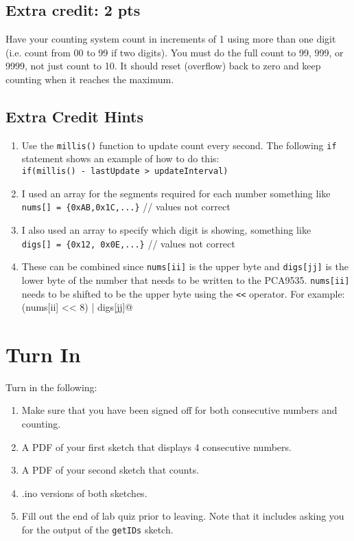 \subsection{Extra credit: 2 pts}
Have your counting system count in increments of 1 using more than one digit (i.e. 
count from 00 to 99 if two digits). You must do the full count to 99, 999, or 9999,
not just count to 10. It should reset (overflow) back to zero and keep counting 
when it reaches the maximum. 
\subsection{Extra Credit Hints}
\begin{enumerate}
    \item Use the \lstinline|millis()| function to update count every second. The 
            following \lstinline|if| statement shows an example of how to do this: \\
            \lstinline|if(millis() - lastUpdate > updateInterval)|
    \item I used an array for the segments required for each number something like \\
            \lstinline|nums[] = {0xAB,0x1C,...}|  // values not correct
    \item I also used an array to specify which digit is showing, something like \\
            \lstinline|digs[] = {0x12, 0x0E,...}| // values not correct
    \item These can be combined since \lstinline|nums[ii]| is the upper byte and 
            \lstinline|digs[jj]| is the lower byte of the number that needs to be 
            written to the PCA9535. \lstinline|nums[ii]| needs to be shifted to be 
            the upper byte using the \lstinline|<<| operator. For example: \\
            \lstinline@(nums[ii] << 8) | digs[jj]@ 
\end{enumerate}

\section{Turn In}
Turn in the following:
\begin{enumerate}
    \item Make sure that you have been signed off for both consecutive numbers and counting.
    \item A PDF of your first sketch that displays 4 consecutive numbers.
    \item A PDF of your second sketch that counts.
    \item .ino versions of both sketches.
    \item Fill out the end of lab quiz prior to leaving. Note that it includes asking you 
            for the output of the \lstinline$getIDs$ sketch. 
\end{enumerate}